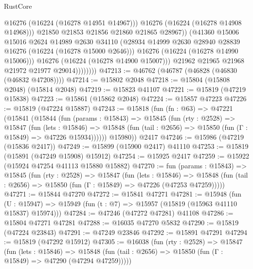 \begin{lexlean}{RustCore}
\begin{coremodule}
                              @16276
                              (@16224 (@16278 @14951 @14967)))
                            @16276
                            (@16224 (@16278 @14908 @14968)))
                          @21850
                          @21853
                          @21856
                          @21860
                          @21865
                          @28967))
                      (@41360
                        @15006
                        @15016
                        @2624
                        @14989
                        @2630
                        @34110
                        (@28934 @14999 @2630 @28940 @28839 @16276 (@16224 (@16278 @15000 @2646)))
                        @16276
                        (@16224 (@16278 @14990 @15006)))
                      @16276
                      (@16224 (@16278 @14900 @15007)))
                    @21962
                    @21965
                    @21968
                    @21972
                    @21977
                    @29014))))))))
@47213 := @46762 (@46787 (@46828 (@46830 (@46832 @47208))))
@47214 := @15802 @2048
@47218 := @15804 (@15808 @2048) (@15814 @2048)
@47219 := @15823 @41107
@47221 := @15819 (@47219 @15838)
@47223 := @15861 (@15862 @2048)
@47224 := @15857 @47223
@47226 := @15819 (@47224 @15887)
@47243 := @15818
    (fun (fn : @63) =>
    @47221
      (@15841
        (@15844
          (fun (params : @15843) =>
          @15845
            (fun (rty : @2528) =>
            @15847
              (fun (lets : @15846) =>
              @15848 (fun (tail : @2656) => @15850 (fun (Γ : @15849) => @47226 @15934))))))
        @15980))
    @2417
@47246 := @15986 (@47219 (@15836 @2417))
@47249 := @15899 (@15900 @2417) @41110
@47253 := @15819 (@15891 (@47249 @15908) @15912)
@47254 := @15925 @2417
@47259 := @15922 (@15924 @47254 @41113 @15880 @15882)
@47270 := fun (params : @15843) =>
  @15845
    (fun (rty : @2528) =>
    @15847
      (fun (lets : @15846) =>
      @15848 (fun (tail : @2656) => @15850 (fun (Γ : @15849) => @47226 (@47253 @47259)))))
@47271 := @15844 @47270
@47272 := @15841 @47271
@47281 := @15948
    (fun (U : @15947) => @15949 (fun (t : @7) => @15957 (@15819 (@15963 @41110 @15837) @15974)))
@47284 := @47246 (@47272 @47281) @41108
@47286 := @15804 @47271 @47281
@47288 := @16035 @47270 @5832
@47290 := @15819 (@47224 @23843)
@47291 := @47249 @23846
@47292 := @15891 @47291
@47294 := @15819 (@47292 @15912)
@47305 := @16038
    (fun (rty : @2528) =>
    @15847
      (fun (lets : @15846) =>
      @15848 (fun (tail : @2656) => @15850 (fun (Γ : @15849) => @47290 (@47294 @47259)))))

\end{coremodule}
\end{lexlean}
